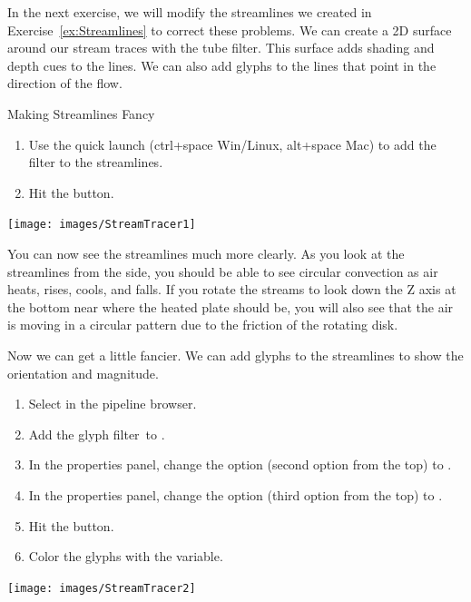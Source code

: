 In the next exercise, we will modify the streamlines we created in
Exercise~\ref{ex:Streamlines} to correct these problems.  We can create a
2D surface around our stream traces with the tube filter.  This surface
adds shading and depth cues to the lines.  We can also add glyphs to the
lines that point in the direction of the flow.

\begin{exercise}{Making Streamlines Fancy}
  \label{ex:MakingStreamlinesFancy}%
  \begin{enumerate}
  \item Use the quick launch (ctrl+space Win/Linux, alt+space Mac) to add
    the  filter to the streamlines.
  \item Hit the \apply button.
    \savecounter
  \end{enumerate}

  \begin{inlinefig}
    \texttt{[image: images/StreamTracer1]}
  \end{inlinefig}

  You can now see the streamlines much more clearly.  As you look at the
  streamlines from the side, you should be able to see circular convection
  as air heats, rises, cools, and falls.  If you rotate the streams to look
  down the Z axis at the bottom near where the heated plate should be, you
  will also see that the air is moving in a circular pattern due to the
  friction of the rotating disk.

  Now we can get a little fancier.  We can add glyphs to the streamlines to
  show the orientation and magnitude.

  \begin{enumerate}
    \restorecounter
  \item Select  in the pipeline browser.
  \item Add the glyph filter~\glyph to .
  \item In the properties panel, change the  option (second
    option from the top) to .
  \item In the properties panel, change the  option (third
    option from the top) to .
  \item Hit the \apply button.
  \item Color the glyphs with the  variable.
  \end{enumerate}

  \begin{inlinefig}
    \texttt{[image: images/StreamTracer2]}
  \end{inlinefig}


\end{exercise}
